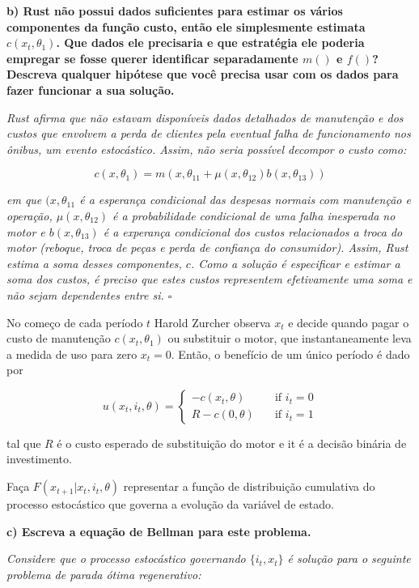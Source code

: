 \documentclass[12pt,a4paper]{article}
\begin{document}
\textbf{b) Rust não possui dados suficientes para estimar os vários
componentes da função custo, então ele simplesmente estimata
\(c(x_t, \theta_1)\). Que dados ele precisaria e que estratégia ele
poderia empregar se fosse querer identificar separadamente \(m()\) e
\(f()\)? Descreva qualquer hipótese que você precisa usar com os dados
para fazer funcionar a sua solução.}

\emph{Rust afirma que não estavam disponíveis dados detalhados de
manutenção e dos custos que envolvem a perda de clientes pela eventual
falha de funcionamento nos ônibus, um evento estocástico. Assim, não
seria possível decompor o custo como:}

\[
c(x,\theta_1) = m(x,\theta_{11}+\mu(x,\theta_{12})b(x,\theta_{13}))
\]

\emph{em que \((x,\theta_{11}\) é a esperança condicional das despesas
normais com manutenção e operação, \(\mu(x,\theta_{12})\) é a
probabilidade condicional de uma falha inesperada no motor e
\(b(x,\theta_{13})\) é a experança condicional dos custos relacionados a
troca do motor (reboque, troca de peças e perda de confiança do
consumidor). Assim, Rust estima a soma desses componentes, \(c\). Como a
solução é especificar e estimar a soma dos custos, é preciso que estes
custos representem efetivamente uma soma e não sejam dependentes entre
si. \(\square\)}

No começo de cada período \(t\) Harold Zurcher observa \(x_t\) e decide
quando pagar o custo de manutenção \(c(x_t, \theta_1)\) ou substituir o
motor, que instantaneamente leva a medida de uso para zero \(x_t = 0\).
Então, o benefício de um único período é dado por

\[ u(x_t,i_t,\theta) = 
  \begin{cases}
    -c(x_t,\theta)    & \quad \text{if } i_t=0\\
    R - c(0,\theta)  & \quad \text{if } i_t=1
  \end{cases}
\]

tal que \(R\) é o custo esperado de substituição do motor e it é a
decisão binária de investimento.

Faça \(F(x_{t+1}| x_t, i_t, \theta)\) representar a função de
distribuição cumulativa do processo estocástico que governa a evolução
da variável de estado.

\textbf{c) Escreva a equação de Bellman para este problema.}

\emph{Considere que o processo estocástico governando \(\{i_t,x_t\}\) é
solução para o seguinte problema de parada ótima regenerativo:}
\end{document}
